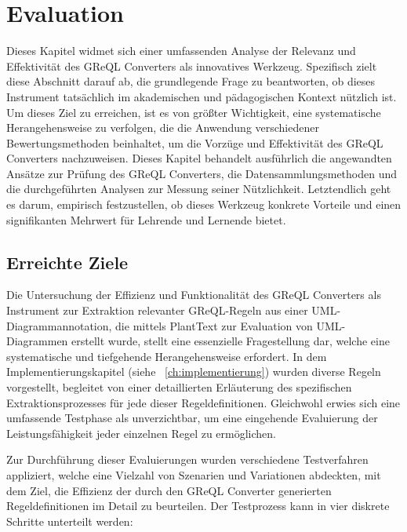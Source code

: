 \chapter{Evaluation}

Dieses Kapitel widmet sich einer umfassenden Analyse der Relevanz und Effektivität des GReQL Converters als innovatives
Werkzeug. Spezifisch zielt diese Abschnitt darauf ab, die grundlegende Frage zu beantworten, ob dieses Instrument
tatsächlich im akademischen und pädagogischen Kontext nützlich ist. Um dieses Ziel zu erreichen, ist es von größter
Wichtigkeit, eine systematische Herangehensweise zu verfolgen, die die Anwendung verschiedener Bewertungsmethoden
beinhaltet, um die Vorzüge und Effektivität des GReQL Converters nachzuweisen. Dieses Kapitel behandelt ausführlich die
angewandten Ansätze zur Prüfung des GReQL Converters, die Datensammlungsmethoden und die durchgeführten Analysen zur
Messung seiner Nützlichkeit. Letztendlich geht es darum, empirisch festzustellen, ob dieses Werkzeug konkrete Vorteile
und einen signifikanten Mehrwert für Lehrende und Lernende bietet.

\section{Erreichte Ziele}\label{sec:erreichte-ziele}

Die Untersuchung der Effizienz und Funktionalität des GReQL Converters als Instrument zur Extraktion relevanter
GReQL-Regeln aus einer UML-Diagrammannotation, die mittels PlantText zur Evaluation von UML-Diagrammen erstellt wurde,
stellt eine essenzielle Fragestellung dar, welche eine systematische und tiefgehende Herangehensweise erfordert. In dem
Implementierungskapitel (siehe ~\ref{ch:implementierung}) wurden diverse Regeln vorgestellt, begleitet von einer detaillierten Erläuterung des
spezifischen Extraktionsprozesses für jede dieser Regeldefinitionen. Gleichwohl erwies sich eine umfassende Testphase
als unverzichtbar, um eine eingehende Evaluierung der Leistungsfähigkeit jeder einzelnen Regel zu ermöglichen.

Zur Durchführung dieser Evaluierungen wurden verschiedene Testverfahren appliziert, welche eine Vielzahl von Szenarien
und Variationen abdeckten, mit dem Ziel, die Effizienz der durch den GReQL Converter generierten Regeldefinitionen
im Detail zu beurteilen. Der Testprozess kann in vier diskrete Schritte unterteilt werden:

